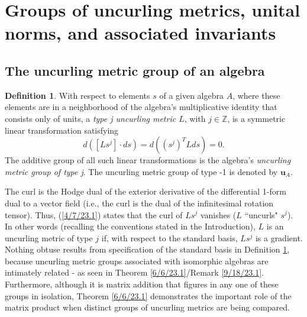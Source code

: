 \documentclass{amsart}
\numberwithin{equation}{section}
\theoremstyle{definition}
\newtheorem{definition}[theorem]{Definition}
\numberwithin{theorem}{section}
\begin{document}
           
       \bigskip
       

 \section{Groups of uncurling metrics, unital norms, and associated  invariants}
 
 
   
   \subsection{The uncurling metric group of an algebra}
     
  \begin{definition}\label{7/21/23.1} With respect to elements $s$ of a given algebra $A$, where these elements are in a neighborhood of the algebra's multiplicative identity that consists only of units, a  {\it type j uncurling metric $L$}, with $j\in \mathbb{Z}$, is a symmetric linear transformation  satisfying \begin{equation}\label{4/7/23.1} d([Ls^j]\cdot ds) = d\left((s^j)^T L ds\right) = 0. \end{equation}  The additive group of all such linear transformations is the algebra's {\it uncurling metric group of type j}.  The uncurling metric group of type -1 is denoted by $\mathbf{u}_A$.   \end{definition}
  
  \enlargethispage{1cm}
  
 The curl is the Hodge dual of the exterior derivative of the differential \mbox{1-form} dual to a vector field (i.e., the curl is the dual of the infinitesimal rotation tensor).  Thus, (\ref{4/7/23.1}) states that the curl of $Ls^j$ vanishes ($L$ ``uncurls" $s^j$).    In other words (recalling the conventions stated in the Introduction), $L$ is an uncurling metric of type $j$ if, with respect to the standard basis, $Ls^j$ is a gradient.   Nothing obtuse results from specification of the standard basis in Definition \ref{7/21/23.1}, because uncurling metric groups associated with isomorphic algebras are intimately related - as seen in Theorem \ref{6/6/23.1}/Remark \ref{9/18/23.1}.
  Furthermore, although it is matrix addition that figures  \enlargethispage{.6cm} in any one of these groups in isolation, Theorem \ref{6/6/23.1} demonstrates the important role of the matrix product when distinct groups of uncurling metrics are being compared.  
   
\end{document}
